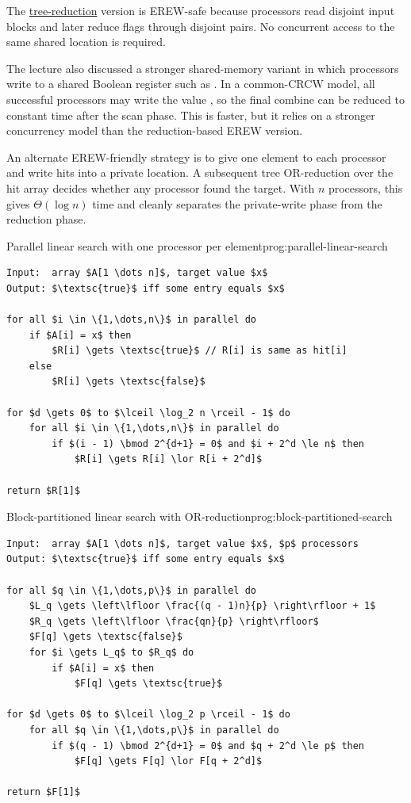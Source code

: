 \begin{ppnote}
The \hyperref[fig:block-search-part]{tree-reduction} version is EREW-safe because processors read disjoint input
blocks and later reduce flags through disjoint pairs. No concurrent access to
the same shared location is required.
\end{ppnote}

The lecture also discussed a stronger shared-memory variant in which processors
write to a shared Boolean register such as . In a common-CRCW
model, all successful processors may write the value , so the final
combine can be reduced to constant time after the scan phase. This is faster,
but it relies on a stronger concurrency model than the reduction-based EREW version.

An alternate EREW-friendly strategy is to give one element to each processor and
write hits into a private  location. A subsequent tree OR-reduction
over the hit array decides whether any processor found the target. With $n$ processors,
this gives $\Theta(\log n)$ time and cleanly separates the private-write phase from
the reduction phase.

\begin{ppprogram}{Parallel linear search with one processor per element}{prog:parallel-linear-search}
\begin{lstlisting}[language=Pseudocode,style=pppseudocode]
Input:  array $A[1 \dots n]$, target value $x$
Output: $\textsc{true}$ iff some entry equals $x$

for all $i \in \{1,\dots,n\}$ in parallel do
    if $A[i] = x$ then
        $R[i] \gets \textsc{true}$ // R[i] is same as hit[i]
    else
        $R[i] \gets \textsc{false}$ 

for $d \gets 0$ to $\lceil \log_2 n \rceil - 1$ do
    for all $i \in \{1,\dots,n\}$ in parallel do
        if $(i - 1) \bmod 2^{d+1} = 0$ and $i + 2^d \le n$ then
            $R[i] \gets R[i] \lor R[i + 2^d]$

return $R[1]$
\end{lstlisting}
\end{ppprogram}

\begin{ppprogram}{Block-partitioned linear search with OR-reduction}{prog:block-partitioned-search}
\begin{lstlisting}[language=Pseudocode,style=pppseudocode]
Input:  array $A[1 \dots n]$, target value $x$, $p$ processors
Output: $\textsc{true}$ iff some entry equals $x$

for all $q \in \{1,\dots,p\}$ in parallel do
    $L_q \gets \left\lfloor \frac{(q - 1)n}{p} \right\rfloor + 1$
    $R_q \gets \left\lfloor \frac{qn}{p} \right\rfloor$
    $F[q] \gets \textsc{false}$
    for $i \gets L_q$ to $R_q$ do
        if $A[i] = x$ then
            $F[q] \gets \textsc{true}$

for $d \gets 0$ to $\lceil \log_2 p \rceil - 1$ do
    for all $q \in \{1,\dots,p\}$ in parallel do
        if $(q - 1) \bmod 2^{d+1} = 0$ and $q + 2^d \le p$ then
            $F[q] \gets F[q] \lor F[q + 2^d]$

return $F[1]$
\end{lstlisting}
\end{ppprogram}

